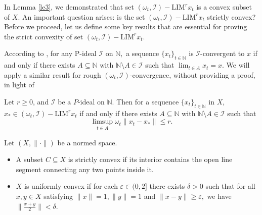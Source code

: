 \documentclass[reqno]{amsart}
\begin{document}
{  
  In Lemma \ref{le3}, we demonstrated that set $(\omega_t,\mathcal{I})-\text{LIM}^{r} x_t$ is a convex subset of $X$. An important question arises: is the set $(\omega_t,\mathcal{I})-\text{LIM}^{r} x_t$ strictly convex? Before we proceed, let us define some key results that are essential for proving the strict convexity of set $(\omega_t,\mathcal{I})-\text{LIM}^{r} x_t.$
  
  
  
  
  
   
 According to \cite[Theorem 3.2]{kostyrko2000convergence}\label{usual subsequence}, for any P-ideal $\mathcal{I}$ on $\mathbb{N},$ a sequence $\{x_t\}_{t\in\mathbb{N}}$ is $\mathcal{I}$-convergent to $x$ if and only if there exists $A\subseteq\mathbb{N}$ with $\mathbb{N}\setminus A\in \mathcal{I}$ such that $\displaystyle\lim_{t\in A}x_t=x.$ We will apply a similar result for rough $(\omega_t,\mathcal{I})$-convergence, without providing a proof,  in light of \cite[Theorem 3.2(i)]{kostyrko2000convergence}

\begin{lemma}\label{Th 2.2}
	Let $r\geq 0$, and $\mathcal{I}$ be a $P$-ideal on $\mathbb{N}$. 
	Then for a sequence $\{x_t\}_{t\in\mathbb{N}}$ in $X$, $x_*\in (\omega_t,\mathcal{I})-\text{LIM}^{r} x_t$ if and only if there exists $A\subseteq \mathbb{N}$ with $\mathbb{N}\setminus A\in\mathcal{I}$ such that
	 $$\displaystyle\limsup_{t\in A}\omega_t\|x_t-x_*\|\leq r.$$
  \end{lemma}





\begin{definition} \cite{megginson2012introduction, xuan2003rough} Let $(X,\|\cdot\|)$ be a normed space.
	\begin{itemize} 
\item [(i)]  A subset $C\subseteq X$ is  strictly convex  if its interior contains the open line segment connecting any two points inside it.
\item[(ii)] $X$ is uniformly convex if for each $\varepsilon\in (0,2]$ there exists $\delta>0$ such that for all $x,y\in X$ satisfying $\|x\|=1,\|y\|=1$ and $\|x-y\|\geq\varepsilon,$ we have $\|\frac{x+y}{2}\|<\delta.$ 
\end{itemize} 
\end{definition}




}
\end{document}
